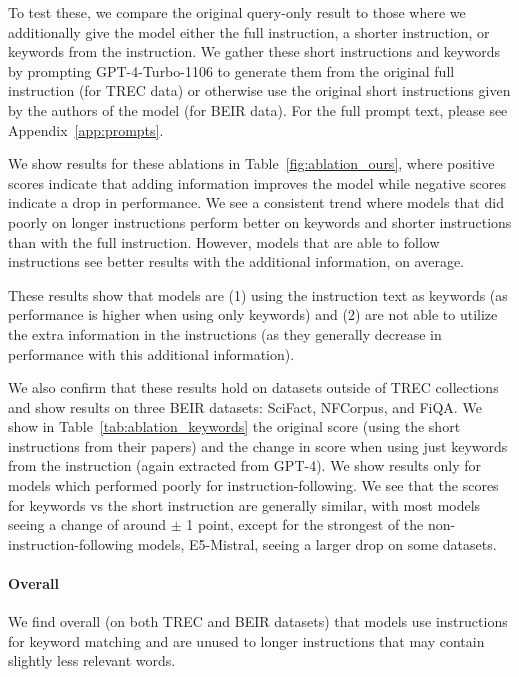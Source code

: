 \documentclass{article} %
\begin{document}



To test these, we compare the original query-only result to those where we additionally give the model either the full instruction, a shorter instruction, or keywords from the instruction. We gather these short instructions and keywords by prompting GPT-4-Turbo-1106 to generate them from the original full instruction (for TREC data) or otherwise use the original short instructions given by the authors of the model (for BEIR data).  For the full prompt text, please see Appendix~\ref{app:prompts}.

We show results for these ablations in Table~\ref{fig:ablation_ours}, where positive scores indicate that adding information improves the model while negative scores indicate a drop in performance. We see a consistent trend where models that did poorly on longer instructions perform better on keywords and shorter instructions than with the full instruction. However, models that are able to follow instructions see better results with the additional information, on average.

These results show that models are (1) using the instruction text as keywords (as performance is higher when using only keywords) and (2) are not able to utilize the extra information in the instructions (as they generally decrease in performance with this additional information).

We also confirm that these results hold on datasets outside of TREC collections and show results on three BEIR datasets: SciFact, NFCorpus, and FiQA.  We show in Table~\ref{tab:ablation_keywords} the original score (using the short instructions from their papers) and the change in score when using just keywords from the instruction (again extracted from GPT-4). We show results only for models which performed poorly for instruction-following.
We see that the scores for keywords vs the short instruction are generally similar, with most models seeing a change of around $\pm$ 1 point, except for the strongest of the non-instruction-following models, E5-Mistral, seeing a larger drop on some datasets.

\paragraph{Overall} We find overall (on both TREC and BEIR datasets) that models use instructions for keyword matching and are unused to longer instructions that may contain slightly less relevant words. 
\end{document}
